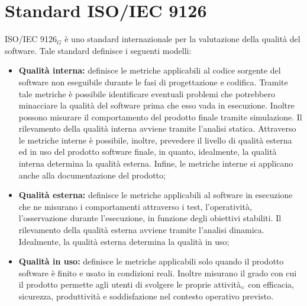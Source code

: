 \chapter{Standard ISO/IEC 9126}\label{StandardISO/IEC9126}
ISO/IEC 9126$_G$ è uno standard internazionale per la valutazione della qualità del software.
Tale standard definisce i seguenti modelli:
\begin{itemize}
	\item \textbf{Qualità interna:} definisce le metriche applicabili al codice sorgente del software non eseguibile durante le fasi di progettazione e codifica. Tramite tale metriche è possibile identificare eventuali problemi che potrebbero minacciare la qualità del software prima che esso vada in esecuzione. Inoltre possono misurare il comportamento del prodotto finale tramite simulazione. Il rilevamento della qualità interna avviene tramite l’analisi statica. Attraverso le metriche interne è possibile, inoltre, prevedere il livello di qualità esterna ed in uso del prodotto software finale, in quanto, idealmente, la qualità interna determina la qualità esterna. Infine, le metriche interne si applicano anche alla documentazione del prodotto;
	\item \textbf{Qualità esterna:} definisce le metriche applicabili al software in esecuzione che ne misurano i comportamenti attraverso i test, l’operatività, l’osservazione durante l’esecuzione, in funzione degli obiettivi stabiliti. Il rilevamento della qualità esterna avviene tramite l’analisi dinamica. Idealmente, la qualità esterna determina la qualità in uso;
	\item \textbf{Qualità in uso:} definisce le metriche applicabili solo quando il prodotto software è finito e usato in condizioni reali. Inoltre misurano il grado con cui il prodotto permette agli utenti di svolgere le proprie attività$_{\scaleto{G}{3pt}}$ con efficacia, sicurezza, produttività e soddisfazione nel contesto operativo previsto. 
\end{itemize}
